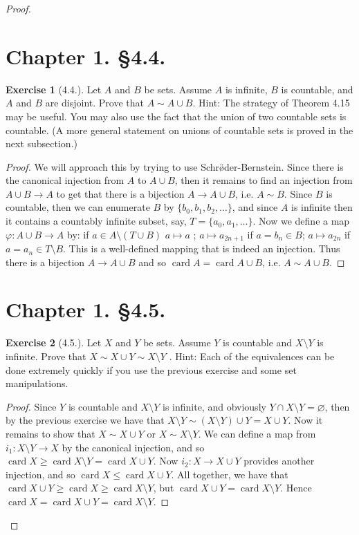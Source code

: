 \documentclass[9pt,reqno]{amsart}
\theoremstyle{definition}
\newtheorem{exercise}{Exercise}[section]
\DeclareMathOperator{\card}{card}
\begin{document}
\begin{proof}
\section*{Chapter 1. \S 4.4.}
\begin{exercise}[4.4.] Let $A$ and $B$ be sets. Assume $A$ is infinite, $B$ is countable, and $A$ and $B$ are disjoint. Prove that $A \sim A \cup B$. Hint: The strategy of Theorem 4.15 may be useful. You may also use the fact that the union of two countable sets is countable. (A more general statement on unions of countable sets is proved in the next subsection.)
\end{exercise}
\begin{proof}
	We will approach this by trying to use Schr\o  ̈der-Bernstein. Since there is the canonical injection from $A$ to $A\cup B$, then it remains to find an injection from $A \cup B \to A$ to get that there is a bijection $A \to A \cup B$, i.e. $A \sim B$. Since $B$ is countable, then we can enumerate $B$ by $\{ b_0, b_1, b_2, \ldots \}$, and since $A$ is infinite then it contains a countably infinite subset, say,  $T = \{ a_0, a_1, \ldots \}$. Now we define a map $\varphi \colon A \cup B \to A$ by: if $a \in A \setminus (T \cup B)$ $a \mapsto a $ ; $a \mapsto a_{2n+1}$ if $a = b_n \in B$; $a \mapsto a_{2n}$ if $a = a_{n} \in T \setminus B$. This is a well-defined mapping that is indeed an injection. Thus there is a bijection $A \to A \cup B$ and so $\card A = \card A \cup B$, i.e. $A \sim A \cup B$.
	\end{proof}

\section*{Chapter 1. \S 4.5.}
\begin{exercise}[4.5.] Let $X$ and $Y$ be sets. Assume $Y$ is countable and $X \setminus Y$ is infinite. Prove that $X \sim X \cup Y \sim X\setminus Y$ . Hint: Each of the equivalences can be done extremely quickly if you use the previous exercise and some set manipulations.
	
\end{exercise}

\begin{proof}
	Since $Y$ is countable and $X \setminus Y$ is infinite, and obviously $Y \cap X \setminus Y = \varnothing$, then by the previous exercise we have that $X \setminus Y \sim (X\setminus Y) \cup Y = X \cup Y$. Now it remains to show that $X \sim X\cup Y$ or $X \sim X \setminus Y$. We can define a map from $i_1 \colon X \setminus Y \to X$ by the canonical injection, and so $\card X \geq \card X\setminus Y = \card X \cup Y$. Now $i_2 \colon X \to X \cup Y$ provides another injection, and so $\card X \leq \card X \cup Y$. All together, we have that $\card X \cup Y \geq \card X \geq  \card X \setminus Y$, but $\card X \cup Y =  \card X \setminus Y$. Hence $\card X = \card X \cup Y = \card X \setminus Y$. 
\end{proof}

\end{proof}
\end{document}
